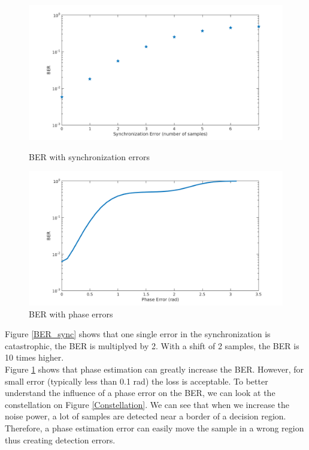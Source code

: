\documentclass[a4paper,12pt]{article}
\begin{document}
\begin{figure}[ht]
\begin{minipage}[c]{.45\linewidth}
\begin{center}
\includegraphics[scale=0.35]{BER_SyncError.png}
\caption{BER with synchronization errors}
\label{BER_sync}
\end{center}
\end{minipage}
\hfill
\begin{minipage}[c]{.45\linewidth}
\begin{center}
\includegraphics[scale=0.35]{BER_PhaseError.png}
\caption{BER with phase errors}
\label{BER_phase}
\end{center}
\end{minipage}
\end{figure}

Figure \ref{BER_sync} shows that one single error in the synchronization is catastrophic, the BER is multiplyed by 2. With a shift of 2 samples, the BER is 10 times higher.\\

Figure \ref{BER_phase} shows that phase estimation can greatly increase the BER. However, for small error (typically less than 0.1 rad) the loss is acceptable. To better understand the influence of a phase error on the BER, we can look at the constellation on Figure \ref{Constellation}. We can see that when we increase the noise power, a lot of samples are detected near a border of a decision region. Therefore, a phase estimation error can easily move the sample in a wrong region thus creating detection errors.
\end{document}
